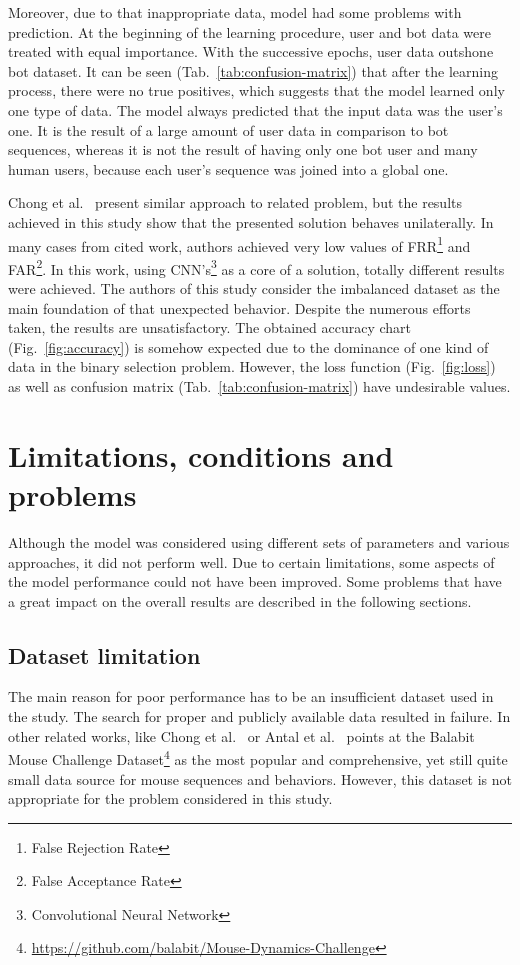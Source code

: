 Moreover, due to that inappropriate data, model had some problems with prediction.
At the beginning of the learning procedure, user and bot data were treated with equal importance.
With the successive epochs, user data outshone bot dataset.
It can be seen \mbox{(Tab.~\ref{tab:confusion-matrix})} that after the learning process, there were no true positives, which suggests that the model learned only one type of data.
The model always predicted that the input data was the user's one.
It is the result of a large amount of user data in comparison to bot sequences, whereas it is not the result of having only one bot user and many human users, because each user's sequence was joined into a global one.

Chong et al.~\cite{Main} present similar approach to related problem, but the results achieved in this study show that the presented solution behaves unilaterally.
In many cases from cited work, authors achieved very low values of FRR\footnote{False Rejection Rate} and FAR\footnote{False Acceptance Rate}\@.
In this work, using CNN's\footnote{Convolutional Neural Network} as a core of a solution, totally different results were achieved.
The authors of this study consider the imbalanced dataset as the main foundation of that unexpected behavior.
Despite the numerous efforts taken, the results are unsatisfactory.
The obtained accuracy chart (Fig.~\ref{fig:accuracy}) is somehow expected due to the dominance of one kind of data in the binary selection problem.
However, the loss function (Fig.~\ref{fig:loss}) as well as confusion matrix (Tab.~\ref{tab:confusion-matrix}) have undesirable values.


\section{Limitations, conditions and problems}\label{sec:limitations-conditions-problems}
Although the model was considered using different sets of parameters and various approaches, it did not perform well.
Due to certain limitations, some aspects of the model performance could not have been improved.
Some problems that have a great impact on the overall results are described in the following sections.

\subsection{Dataset limitation}\label{subsec:dataset-limitation}
The main reason for poor performance has to be an insufficient dataset used in the study.
The search for proper and publicly available data resulted in failure.
In other related works, like Chong et al.~\cite{Main} or Antal et al.~\cite{balabit1} points at the Balabit Mouse Challenge Dataset\footnote{\url{https://github.com/balabit/Mouse-Dynamics-Challenge}} as the most popular and comprehensive, yet still quite small data source for mouse sequences and behaviors.
However, this dataset is not appropriate for the problem considered in this study.

